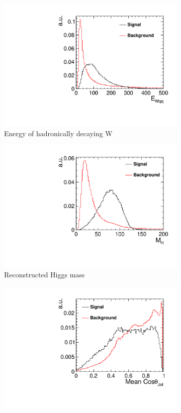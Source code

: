 \begin{figure}[h]
\begin{subfigure}[]{0.5\linewidth}
    \centering
    \includegraphics[width=0.75\linewidth]{Appendix/figures/EWqq} 
    \caption{Energy of hadronically decaying W} 
    \vspace{4ex}
  \end{subfigure}%
  \begin{subfigure}[]{0.5\linewidth}
    \centering
    \includegraphics[width=0.75\linewidth]{Appendix/figures/HiggsMass} 
    \caption{Reconstructed Higgs mass} 
    \vspace{4ex}
  \end{subfigure}
    \begin{subfigure}[]{0.5\linewidth}
    \centering
    \includegraphics[width=0.75\linewidth]{Appendix/figures/JetCosTheta} 

\end{subfigure}
\end{figure}
